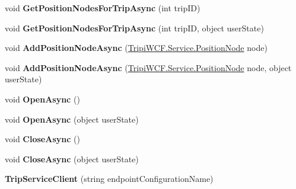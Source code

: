 \begin{DoxyCompactItemize}
\item 
\hypertarget{class_trip_service_client_a951dcd79dea5f318face9724af2fffa9}{
void {\bfseries GetPositionNodesForTripAsync} (int tripID)}
\label{class_trip_service_client_a951dcd79dea5f318face9724af2fffa9}

\item 
\hypertarget{class_trip_service_client_af0903820950892fbd3063b8af0683e1f}{
void {\bfseries GetPositionNodesForTripAsync} (int tripID, object userState)}
\label{class_trip_service_client_af0903820950892fbd3063b8af0683e1f}

\item 
\hypertarget{class_trip_service_client_a2f46a97c1e1e43c6aaa2dd1087fb59f3}{
void {\bfseries AddPositionNodeAsync} (\hyperlink{class_tripi_w_c_f_1_1_service_1_1_position_node}{TripiWCF.Service.PositionNode} node)}
\label{class_trip_service_client_a2f46a97c1e1e43c6aaa2dd1087fb59f3}

\item 
\hypertarget{class_trip_service_client_a96846c11d938c1877149a2334bb2d901}{
void {\bfseries AddPositionNodeAsync} (\hyperlink{class_tripi_w_c_f_1_1_service_1_1_position_node}{TripiWCF.Service.PositionNode} node, object userState)}
\label{class_trip_service_client_a96846c11d938c1877149a2334bb2d901}

\item 
\hypertarget{class_trip_service_client_a503f35d50a103ae9c704a8556a495317}{
void {\bfseries OpenAsync} ()}
\label{class_trip_service_client_a503f35d50a103ae9c704a8556a495317}

\item 
\hypertarget{class_trip_service_client_a766c4bf2b4c822c96d24bca6ab19de05}{
void {\bfseries OpenAsync} (object userState)}
\label{class_trip_service_client_a766c4bf2b4c822c96d24bca6ab19de05}

\item 
\hypertarget{class_trip_service_client_af7270b9fb14203468c5dc31e20a8481b}{
void {\bfseries CloseAsync} ()}
\label{class_trip_service_client_af7270b9fb14203468c5dc31e20a8481b}

\item 
\hypertarget{class_trip_service_client_a8e789b6b99bd805a926fc81c1c5b3f8a}{
void {\bfseries CloseAsync} (object userState)}
\label{class_trip_service_client_a8e789b6b99bd805a926fc81c1c5b3f8a}

\item 
\hypertarget{class_trip_service_client_a00bff7b4e57709fa66367f838cc62003}{
{\bfseries TripServiceClient} (string endpointConfigurationName)}
\label{class_trip_service_client_a00bff7b4e57709fa66367f838cc62003}


\end{DoxyCompactItemize}
